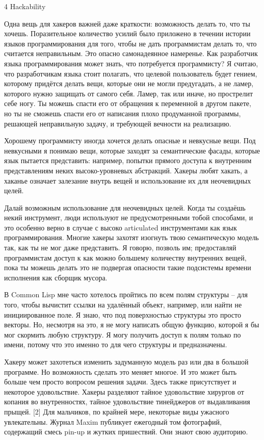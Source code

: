 \documentclass[ebook,12pt,oneside,openany]{memoir}
\begin{document}
4 Hackability


Одна вещь для хакеров важней даже краткости: возможность делать то,
что ты хочешь. Поразительное количество усилий было приложено в
течении истории языков программирования для того, чтобы не дать
программистам делать то, что считается неправильным. Это опасно
самонадеянное намеренье. Как разработчик языка программирования может
знать, что потребуется программисту? Я считаю, что разработчикам языка
стоит полагать, что целевой пользователь будет гением, которому
придётся делать вещи, которые они не могли предугадать, а не ламер,
которого нужно защищать от самого себя. Ламер, так или иначе, но
прострелит себе ногу. Ты можешь спасти его от обращения к переменной в
другом пакете, но ты не сможешь спасти его от написания плохо
продуманной программы, решающей неправильную задачу, и требующей
вечности на реализацию.

Хорошему программисту иногда хочется делать опасные и невкусные вещи.
Под невкусными я понимаю вещи, которые заходят за семантические
фасады, которые язык пытается представить: например, попытки прямого
доступа к внутренним представлениям неких высоко-уровневых абстракций.
Хакеры любят хакать, а хаканье означает залезание внутрь вещей и
использование их для неочевидных целей.

Далай возможным использование для неочевидных целей. Когда ты создаёшь
некий инструмент, люди используют не предусмотренными тобой способами,
и это особенно верно в случае с высоко articulated инструментами как
язык программирования. Многие хакеры захотят изогнуть твою
семантическую модель так, как ты не мог даже представить. Я говорю,
позволь им; предоставляй программистам доступ к как можно большему
количеству внутренних вещей, пока ты можешь делать это не подвергая
опасности такие подсистемы времени исполнения как сборщик мусора.

В Common Lisp мне часто хотелось пройтись по всем полям структуры --
для того, чтобы вычистит ссылки на удалённый объект, например, или
найти не инициированное поле. Я знаю, что под поверхностью структуры
это просто векторы. Но, несмотря на это, я не могу написать общую
функцию, которой я бы мог скормить любую структуру. Я могу получить
доступ к полям только по имени, потому что это именно то для чего
структуры и предназначены.

Хакеру может захотеться изменить задуманную модель раз или два в
большой программе. Но возможность сделать это меняет многое. И это
может быть больше чем просто вопросом решения задачи. Здесь также
присутствует и некоторое удовольствие. Хакеры разделяют тайное
удовольствие хирургов от копания во внутренностях, тайное удовольствие
тинейджеров от выдавливания прыщей. [2] Для мальчиков, по крайней
мере, некоторые виды ужасного увлекательны. Журнал Maxim публикует
ежегодный том фотографий, содержащий смесь pin-up и жутких пришествий.
Они знают свою аудиторию.
\end{document}
